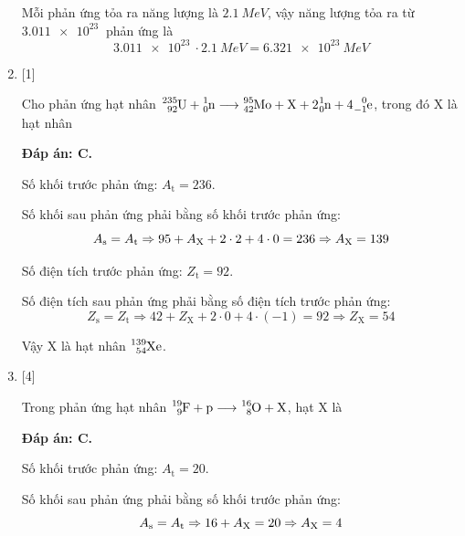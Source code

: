 \begin{enumerate}[label=\bfseries Câu \arabic*:]
{		Mỗi phản ứng tỏa ra năng lượng là $\SI{2.1}{MeV}$, vậy năng lượng tỏa ra từ $\SI{3.011e23}{}$ phản ứng là
		$$\SI{3.011e23}{} \cdot \SI{2.1}{MeV} = \SI{6.321e23}{MeV}$$
		
	}
	\item {} [1]
	
	\cauhoi
	{Cho phản ứng hạt nhân $\ce{^235_92 U} + \ce{^1_0 n} \longrightarrow \ce{^95_42 Mo} + \ce{X} + 2\ce{^1_0 n} + 4\ce{^0_{-1} e}$, trong đó X là hạt nhân
	}
	
	\loigiai
	{		\textbf{Đáp án: C.}
		
		Số khối trước phản ứng: $A_\text{t} = 236$.
		
		Số khối sau phản ứng phải bằng số khối trước phản ứng:
		$$A_\text{s} = A_\text{t} \Rightarrow 95+A_\text X+2\cdot 2 + 4 \cdot 0 = 236 \Rightarrow A_\text X = 139$$
		
		Số điện tích trước phản ứng: $Z_\text{t} = 92$.
		
		Số điện tích sau phản ứng phải bằng số điện tích trước phản ứng:
		$$Z_\text{s} = Z_\text{t} \Rightarrow 42 + Z_\text{X} + 2 \cdot 0 + 4 \cdot(-1) = 92 \Rightarrow Z_\text{X} = 54$$
		
		Vậy X là hạt nhân $\ce{^139_54 Xe}$.
		
	}
	
	\item {} [4]
	
	\cauhoi
	{Trong phản ứng hạt nhân $\ce{^19_9 F} + \ce{p} \longrightarrow \ce{^16_8 O} + \ce{X}$, hạt X là
	}
	
	\loigiai
	{		\textbf{Đáp án: C.}
		
			Số khối trước phản ứng: $A_\text{t} = 20$.
		
		Số khối sau phản ứng phải bằng số khối trước phản ứng:
		$$A_\text{s} = A_\text{t} \Rightarrow 16+A_\text X = 20 \Rightarrow A_\text X = 4$$
		
}
\end{enumerate}
